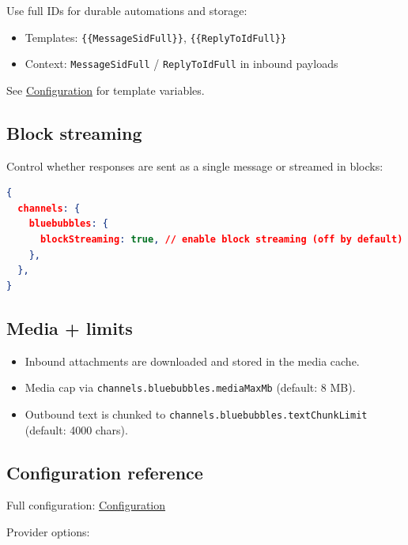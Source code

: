 Use full IDs for durable automations and storage:

\begin{itemize}
  \item Templates: \texttt{\{\{MessageSidFull\}\}}, \texttt{\{\{ReplyToIdFull\}\}}
  \item Context: \texttt{MessageSidFull} / \texttt{ReplyToIdFull} in inbound payloads
\end{itemize}


See \href{/gateway/configuration}{Configuration} for template variables.

\subsection{Block streaming}


Control whether responses are sent as a single message or streamed in blocks:

\begin{lstlisting}[language=json]
{
  channels: {
    bluebubbles: {
      blockStreaming: true, // enable block streaming (off by default)
    },
  },
}
\end{lstlisting}


\subsection{Media + limits}


\begin{itemize}
  \item Inbound attachments are downloaded and stored in the media cache.
  \item Media cap via \texttt{channels.bluebubbles.mediaMaxMb} (default: 8 MB).
  \item Outbound text is chunked to \texttt{channels.bluebubbles.textChunkLimit} (default: 4000 chars).
\end{itemize}


\subsection{Configuration reference}


Full configuration: \href{/gateway/configuration}{Configuration}

Provider options:

